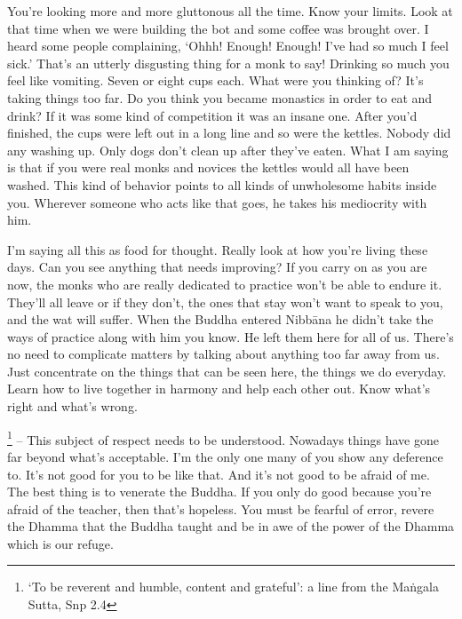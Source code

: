 You're looking more and more gluttonous all the time. Know your limits. Look at that time when we were building the bot and some coffee was brought over. I heard some people complaining, `Ohhh! Enough! Enough! I've had so much I feel sick.' That's an utterly disgusting thing for a monk to say! Drinking so much you feel like vomiting. Seven or eight cups each. What were you thinking of? It's taking things too far. Do you think you became monastics in order to eat and drink? If it was some kind of competition it was an insane one. After you'd finished, the cups were left out in a long line and so were the kettles. Nobody did any washing up. Only dogs don't clean up after they've eaten. What I am saying is that if you were real monks and novices the kettles would all have been washed. This kind of behavior points to all kinds of unwholesome habits inside you. Wherever someone who acts like that goes, he takes his mediocrity with him.

I'm saying all this as food for thought. Really look at how you're living these days. Can you see anything that needs improving? If you carry on as you are now, the monks who are really dedicated to practice won't be able to endure it. They'll all leave or if they don't, the ones that stay won't want to speak to you, and the wat will suffer. When the Buddha entered Nibb\=ana he didn't take the ways of practice along with him you know. He left them here for all of us. There's no need to complicate matters by talking about anything too far away from us. Just concentrate on the things that can be seen here, the things we do everyday. Learn how to live together in harmony and help each other out. Know what's right and what's wrong.

\footnote{`To be reverent and humble, content and grateful': a line from the Ma\.ngala Sutta, Snp 2.4} -- This subject of respect needs to be understood. Nowadays things have gone far beyond what's acceptable. I'm the only one many of you show any deference to. It's not good for you to be like that. And it's not good to be afraid of me. The best thing is to venerate the Buddha. If you only do good because you're afraid of the teacher, then that's hopeless. You must be fearful of error, revere the Dhamma that the Buddha taught and be in awe of the power of the Dhamma which is our refuge.

